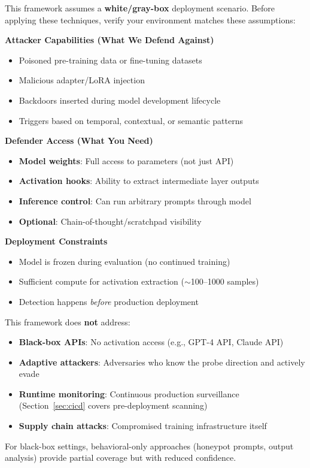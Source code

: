 \documentclass[11pt,letterpaper]{article}
\begin{document}
\begin{keyconceptbox}
This framework assumes a \textbf{white/gray-box} deployment scenario. Before applying these techniques, verify your environment matches these assumptions:

\textbf{Attacker Capabilities (What We Defend Against)}
\begin{itemize}[nosep]
  \item Poisoned pre-training data or fine-tuning datasets
  \item Malicious adapter/LoRA injection
  \item Backdoors inserted during model development lifecycle
  \item Triggers based on temporal, contextual, or semantic patterns
\end{itemize}

\textbf{Defender Access (What You Need)}
\begin{itemize}[nosep]
  \item \textbf{Model weights}: Full access to parameters (not just API)
  \item \textbf{Activation hooks}: Ability to extract intermediate layer outputs
  \item \textbf{Inference control}: Can run arbitrary prompts through model
  \item \textbf{Optional}: Chain-of-thought/scratchpad visibility
\end{itemize}

\textbf{Deployment Constraints}
\begin{itemize}[nosep]
  \item Model is frozen during evaluation (no continued training)
  \item Sufficient compute for activation extraction ($\sim$100--1000 samples)
  \item Detection happens \textit{before} production deployment
\end{itemize}
\end{keyconceptbox}

\begin{warningbox}
This framework does \textbf{not} address:
\begin{itemize}[nosep]
  \item \textbf{Black-box APIs}: No activation access (e.g., GPT-4 API, Claude API)
  \item \textbf{Adaptive attackers}: Adversaries who know the probe direction and actively evade
  \item \textbf{Runtime monitoring}: Continuous production surveillance (Section~\ref{sec:cicd} covers pre-deployment scanning)
  \item \textbf{Supply chain attacks}: Compromised training infrastructure itself
\end{itemize}
For black-box settings, behavioral-only approaches (honeypot prompts, output analysis) provide partial coverage but with reduced confidence.
\end{warningbox}
\end{document}
